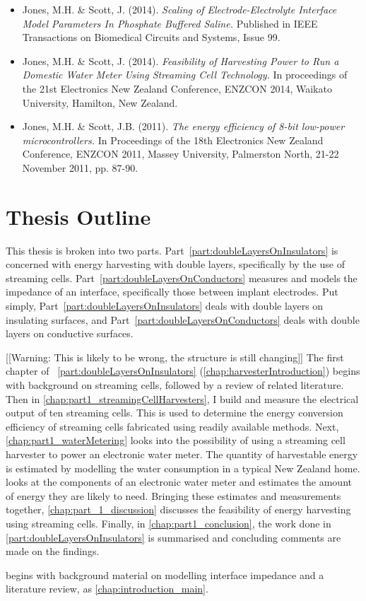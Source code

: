   \begin{itemize}
    \item Jones, M.H. \& Scott, J. (2014). \emph{Scaling of Electrode-Electrolyte Interface Model Parameters In Phosphate Buffered Saline.} Published in IEEE Transactions on Biomedical Circuits and Systems, Issue 99.
    \item Jones, M.H. \& Scott, J. (2014). \emph{Feasibility of Harvesting Power to Run a Domestic Water Meter Using Streaming Cell Technology.} In proceedings of the 21st Electronics New Zealand Conference, ENZCON 2014, Waikato University, Hamilton, New Zealand.
    \item Jones, M.H. \& Scott, J.B. (2011). \emph{The energy efficiency of 8-bit low-power microcontrollers.} In Proceedings of the 18th Electronics New Zealand Conference, ENZCON 2011, Massey University, Palmerston North, 21-22 November 2011, pp. 87-90.
  \end{itemize}


\section{Thesis Outline}


  This thesis is broken into two parts.
  Part~\ref{part:doubleLayersOnInsulators} is concerned with energy harvesting with double layers, specifically by the use of streaming cells.
  Part~\ref{part:doubleLayersOnConductors} measures and models the impedance of an interface, specifically those between implant electrodes.
  Put simply, Part~\ref{part:doubleLayersOnInsulators} deals with double layers on insulating surfaces, and Part~\ref{part:doubleLayersOnConductors} deals with double layers on conductive surfaces.

  [[Warning: This is likely to be wrong, the structure is still changing]]
  The first chapter of ~\ref{part:doubleLayersOnInsulators} (\cref{chap:harvesterIntroduction}) begins with background on streaming cells, followed by a review of related literature.
  Then in \cref{chap:part1_streamingCellHarvesters}, I build and measure the electrical output of ten streaming cells.
  This is used to determine the energy conversion efficiency of streaming cells fabricated using readily available methods.
  Next, \cref{chap:part1_waterMetering} looks into the possibility of using a streaming cell harvester to power an electronic water meter.
  The quantity of harvestable energy is estimated by modelling the water consumption in a typical New Zealand home.
   looks at the components of an electronic water meter and estimates the amount of energy they are likely to need.
  Bringing these estimates and measurements together, \cref{chap:part_1_discussion} discusses the feasibility of energy harvesting using streaming cells.
  Finally, in \cref{chap:part1_conclusion}, the work done in \cref{part:doubleLayersOnInsulators} is summarised and concluding comments are made on the findings.

   begins with background material on modelling interface impedance and a literature review, as \cref{chap:introduction_main}.
